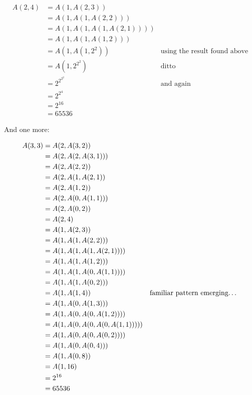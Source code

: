 \documentclass{report}
\begin{document}
\begin{align*}
  A(2, 4) &= A(1, A(2, 3)) \\
          &= A(1, A(1, A(2, 2))) \\
          &= A(1, A(1, A(1, A(2, 1)))) \\
          &= A(1, A(1, A(1, 2))) \\
          &= A(1, A(1, 2^2)) \quad &\text{using the result found above} \\
          &= A(1, 2^{2^2}) \quad &\text{ditto} \\
          &= 2^{2^{2^2}} \quad &\text{and again} \\
          &= 2^{2^4} \\
          &= 2^{16} \\
          &= 65536
\end{align*}

And one more:

\begin{align*}
  A(3, 3) &= A(2, A(3, 2)) \\
          &= A(2, A(2, A(3, 1))) \\
          &= A(2, A(2, 2)) \\
          &= A(2, A(1, A(2, 1)) \\
          &= A(2, A(1, 2)) \\
          &= A(2, A(0, A(1, 1))) \\
          &= A(2, A(0, 2)) \\
          &= A(2, 4) \\
          &= A(1, A(2, 3)) \\
          &= A(1, A(1, A(2, 2))) \\
          &= A(1, A(1, A(1, A(2, 1)))) \\
          &= A(1, A(1, A(1, 2))) \\
          &= A(1, A(1, A(0, A(1, 1)))) \\
          &= A(1, A(1, A(0, 2))) \\
          &= A(1, A(1, 4)) & \text{familiar pattern emerging\dots} \\
          &= A(1, A(0, A(1, 3))) \\
          &= A(1, A(0, A(0, A(1, 2)))) \\
          &= A(1, A(0, A(0, A(0, A(1, 1))))) \\
          &= A(1, A(0, A(0, A(0, 2)))) \\
          &= A(1, A(0, A(0, 4))) \\
          &= A(1, A(0, 8)) \\
          &= A(1, 16) \\
          &= 2^{16} \\
          &= 65536 \\
\end{align*}
\end{document}
